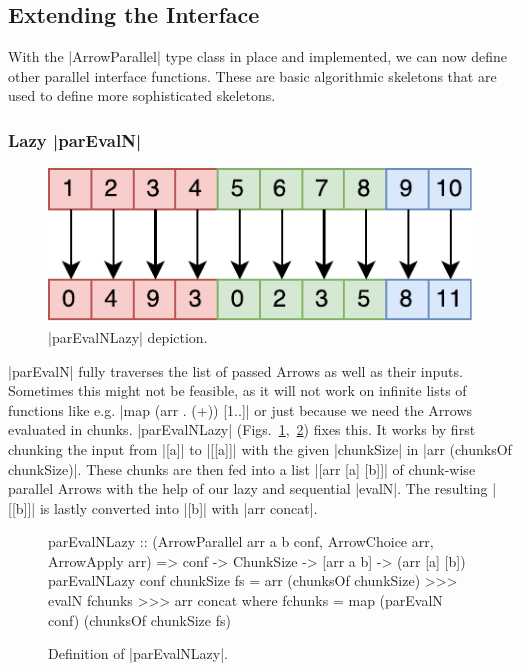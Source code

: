 \subsection{Extending the Interface}
\label{sec:extending-interface}
With the |ArrowParallel| type class in place and implemented, we can now define other parallel interface functions. These are basic algorithmic skeletons that are used to define more sophisticated  skeletons.

\subsubsection{Lazy |parEvalN|}
\begin{figure}[tb]
	\includegraphics[scale=0.7]{images/parEvalNLazy}
	\caption{|parEvalNLazy| depiction.}
	\label{fig:parEvalNLazyImg}
\end{figure}
|parEvalN| fully traverses the list of passed Arrows as well as their inputs. Sometimes this might not be feasible, as it will not work on infinite lists of functions like e.g. |map (arr . (+)) [1..]| or just because we need the Arrows evaluated in chunks. |parEvalNLazy| (Figs.~\ref{fig:parEvalNLazyImg},~\ref{fig:parEvalNLazy}) fixes this. It works by first chunking the input from |[a]| to |[[a]]| with the given |chunkSize| in |arr (chunksOf chunkSize)|. These chunks are then fed into a list |[arr [a] [b]]| of chunk-wise parallel Arrows with the help of our lazy and sequential |evalN|. The resulting |[[b]]| is lastly converted into |[b]| with |arr concat|.
\begin{figure}[t]
\begin{code}
parEvalNLazy :: (ArrowParallel arr a b conf, ArrowChoice arr, ArrowApply arr) =>
	conf -> ChunkSize -> [arr a b] -> (arr [a] [b])
parEvalNLazy conf chunkSize fs =
	arr (chunksOf chunkSize) >>>
    evalN fchunks >>>
    arr concat
    where
      fchunks = map (parEvalN conf) (chunksOf chunkSize fs)
\end{code} %
\caption{Definition of |parEvalNLazy|.}
\label{fig:parEvalNLazy}
\end{figure}

